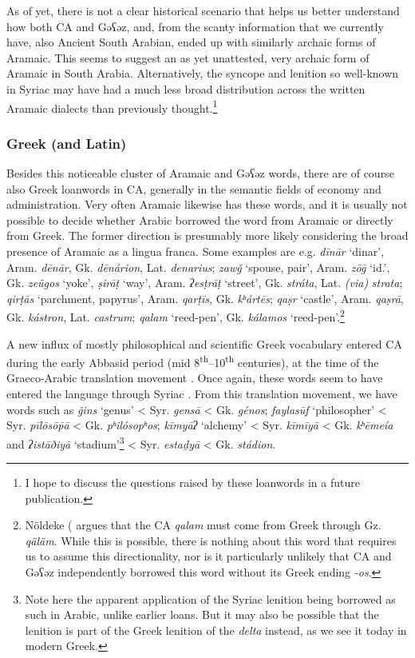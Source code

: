 \documentclass[output=paper]{langsci/langscibook}
\begin{document}
As of yet, there is not a clear historical scenario that helps us better understand how both CA and Gəʕəz, and, from the scanty information that we currently have, also Ancient South Arabian, ended up with similarly archaic forms of Aramaic. This seems to suggest an as yet unattested, very archaic form of Aramaic in South Arabia. Alternatively, the syncope and lenition so well-known in Syriac may have had a much less broad distribution across the written Aramaic dialects than previously thought.\footnote{I hope to discuss the questions raised by these loanwords in a future publication.}

\subsubsection{\label{bkm:Ref13224479}Greek (and Latin)}

Besides this noticeable cluster of Aramaic and Gəʕəz words, there are of course also Greek loanwords in CA, generally in the semantic fields of economy and administration. Very often Aramaic likewise has these words, and it is usually not possible to decide whether Arabic borrowed the word from Aramaic or directly from Greek. The former direction is presumably more likely considering the broad presence of Aramaic as a lingua franca. Some examples are e.g. \textit{dīnār} ‘dinar’, Aram. \textit{dēnār}, Gk. \textit{dēnárion}, Lat. \textit{denarius}; \textit{zawǧ} ‘spouse, pair’, Aram. \textit{zōḡ} ‘id.’, Gk. \textit{zeûgos} ‘yoke’, \textit{ṣirāṭ} ‘way’, Aram. \textit{ʔesṭrāṭ} ‘street’, Gk. \textit{stráta}, Lat. \textit{(via)} \textit{strata}; \textit{qirṭās} ‘parchment, papyrus’, Aram. \textit{qarṭīs}, Gk. \textit{kʰártēs}; \textit{qaṣr} ‘castle’, Aram. \textit{qaṣrā}, Gk. \textit{kástron}, Lat. \textit{castrum}; \textit{qalam} ‘reed-pen’, Gk. \textit{kálamos} ‘reed-pen’.\footnote{Nöldeke (\citeyear[50]{Nöldeke1910} argues that the CA \textit{qalam} must come from Greek through Gz. \textit{qäläm}. While this is possible, there is nothing about this word that requires us to assume this directionality, nor is it particularly unlikely that CA and Gəʕəz independently borrowed this word without its Greek ending \textit{-os}.}

A new influx of mostly philosophical and scientific Greek vocabulary entered CA during the early Abbasid period (mid 8\textsuperscript{th}–10\textsuperscript{th} centuries), at the time of the Graeco-Arabic translation movement \citep{Gutas1998}. Once again, these words seem to have entered the language through Syriac \citep{Gutas2011}. From this translation movement, we have words such as \textit{ǧins} ‘genus’ < Syr. \textit{gensā} < Gk. \textit{génos}; \textit{faylasūf} ‘philosopher’ < Syr. \textit{pīlōsōp̄ā} < Gk. \textit{pʰilósopʰos}; \textit{kīmyāʔ} ‘alchemy’ < Syr. \textit{kīmīyā} < Gk. \textit{kʰēmeía} and \textit{ʔistāðiyā} ‘stadium’\footnote{Note here the apparent application of the Syriac lenition being borrowed as such in Arabic, unlike earlier loans. But it may also be possible that the lenition is part of the Greek lenition of the \textit{delta} instead, as we see it today in modern Greek.} < Syr. \textit{estaḏyā} < Gk. \textit{stádion}.
\end{document}
